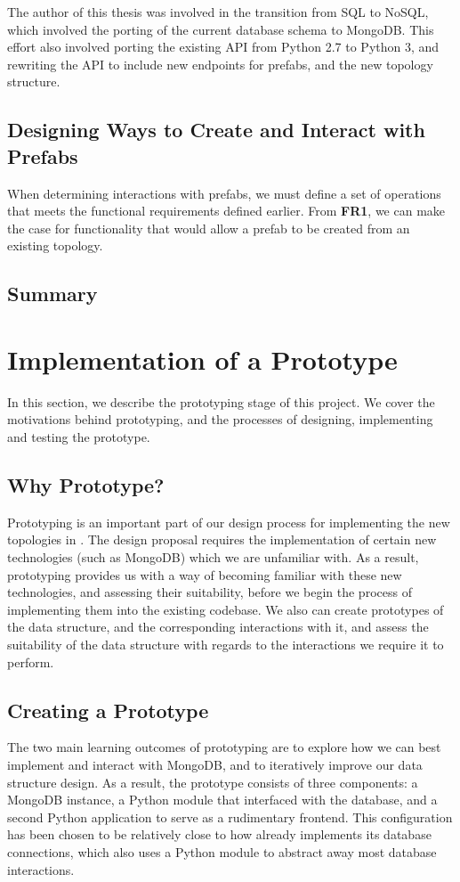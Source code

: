 \documentclass[11pt]{article}
\begin{document}
		The author of this thesis was involved in the transition from SQL to NoSQL, which involved the porting of the current database schema to MongoDB. 
		This effort also involved porting the existing \opendc{} API from Python 2.7 to Python 3, and rewriting the API to include new endpoints for prefabs, and the new topology structure.


	\subsection{Designing Ways to Create and Interact with Prefabs}
		When determining interactions with prefabs, we must define a set of operations that meets the functional requirements defined earlier.
		From \textbf{FR1}, we can make the case for functionality that would allow a prefab to be created from an existing topology.
		
	\subsection{Summary}

		

\newpage

\section{Implementation of a Prototype} \label{sec:implementation}
	In this section, we describe the prototyping stage of this project.
	We cover the motivations behind prototyping, and the processes of designing, implementing and testing the prototype.
	\subsection{Why Prototype?}
		Prototyping is an important part of our design process for implementing the new topologies in \opendc{}.
		The design proposal requires the implementation of certain new technologies (such as MongoDB) which we are unfamiliar with.
		As a result, prototyping provides us with a way of becoming familiar with these new technologies, and assessing their suitability, before we begin the process of implementing them into the existing \opendc{} codebase.
		We also can create prototypes of the data structure, and the corresponding interactions with it, and assess the suitability of the data structure with regards to the interactions we require it to perform.
	
	\subsection{Creating a Prototype}
		The two main learning outcomes of prototyping are to explore how we can best implement and interact with MongoDB, and to iteratively improve our data structure design.
		As a result, the prototype consists of three components: a MongoDB instance, a Python module that interfaced with the database, and a second Python application to serve as a rudimentary frontend. 
		This configuration has been chosen to be relatively close to how \opendc{} already implements its database connections, which also uses a Python module to abstract away most database interactions.
\end{document}
